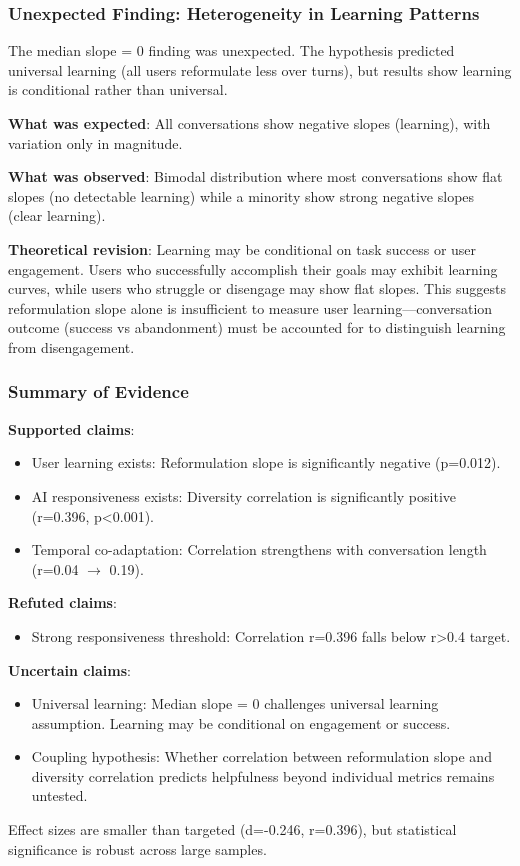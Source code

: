 \subsubsection{Unexpected Finding: Heterogeneity in Learning Patterns}

The median slope = 0 finding was unexpected. The hypothesis predicted universal learning (all users reformulate less over turns), but results show learning is conditional rather than universal.

\textbf{What was expected}: All conversations show negative slopes (learning), with variation only in magnitude.

\textbf{What was observed}: Bimodal distribution where most conversations show flat slopes (no detectable learning) while a minority show strong negative slopes (clear learning).

\textbf{Theoretical revision}: Learning may be conditional on task success or user engagement. Users who successfully accomplish their goals may exhibit learning curves, while users who struggle or disengage may show flat slopes. This suggests reformulation slope alone is insufficient to measure user learning---conversation outcome (success vs abandonment) must be accounted for to distinguish learning from disengagement.

\subsubsection{Summary of Evidence}

\textbf{Supported claims}:
\begin{itemize}
\item User learning exists: Reformulation slope is significantly negative (p=0.012).
\item AI responsiveness exists: Diversity correlation is significantly positive (r=0.396, p<0.001).
\item Temporal co-adaptation: Correlation strengthens with conversation length (r=0.04 $\rightarrow$ 0.19).
\end{itemize}

\textbf{Refuted claims}:
\begin{itemize}
\item Strong responsiveness threshold: Correlation r=0.396 falls below r>0.4 target.
\end{itemize}

\textbf{Uncertain claims}:
\begin{itemize}
\item Universal learning: Median slope = 0 challenges universal learning assumption. Learning may be conditional on engagement or success.
\item Coupling hypothesis: Whether correlation between reformulation slope and diversity correlation predicts helpfulness beyond individual metrics remains untested.
\end{itemize}

Effect sizes are smaller than targeted (d=-0.246, r=0.396), but statistical significance is robust across large samples.
